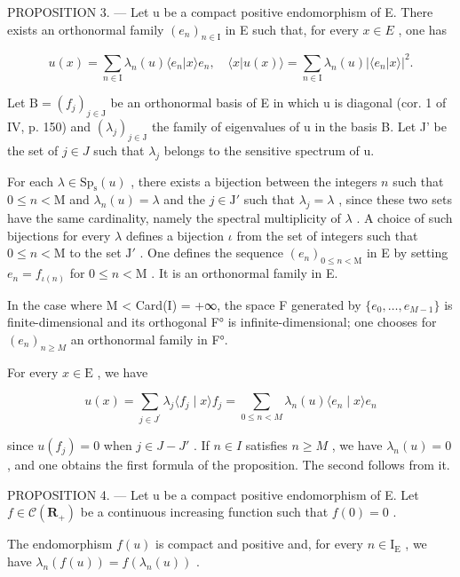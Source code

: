 PROPOSITION 3. --- Let u be a compact positive endomorphism of E. There exists an orthonormal family \((e_{n})_{n\in\mathrm{I}}\) in E such that, for every \(x\in E\) , one has

\[
u (x) = \sum_ {n \in \mathrm{I}} \lambda_ {n} (u) \langle e _ {n} | x \rangle e _ {n}, \quad \langle x | u (x) \rangle = \sum_ {n \in \mathrm{I}} \lambda_ {n} (u) | \langle e _ {n} | x \rangle | ^ {2}.
\]

Let \(\mathrm{B} = (f_{j})_{j \in \mathrm{J}}\) be an orthonormal basis of E in which u is diagonal (cor. 1 of IV, p. 150) and \((\lambda_{j})_{j \in \mathrm{J}}\) the family of eigenvalues of u in the basis B. Let J' be the set of \(j \in J\) such that \(\lambda_{j}\) belongs to the sensitive spectrum of u.

For each \(\lambda \in \mathrm{Sp}_{\mathrm{s}}(u)\) , there exists a bijection between the integers \(n\) such that \(0 \leqslant n < \mathrm{M}\) and \(\lambda_{n}(u) = \lambda\) and the \(j \in \mathrm{J}'\) such that \(\lambda_{j} = \lambda\) , since these two sets have the same cardinality, namely the spectral multiplicity of \(\lambda\) . A choice of such bijections for every \(\lambda\) defines a bijection \(\iota\) from the set of integers such that \(0 \leqslant n < \mathrm{M}\) to the set \(\mathrm{J}'\) . One defines the sequence \((e_n)_{0 \leqslant n < \mathrm{M}}\) in E by setting \(e_n = f_{\iota(n)}\) for \(0 \leqslant n < \mathrm{M}\) . It is an orthonormal family in E.

In the case where M \textless{} Card(I) = +∞, the space F generated by \(\{e_{0},\ldots,e_{M-1}\}\) is finite-dimensional and its orthogonal F° is infinite-dimensional; one chooses for \((e_{n})_{n\geqslant M}\) an orthonormal family in F°.

For every \(x \in \mathrm{E}\) , we have

\[
u (x) = \sum_ {j \in J ^ {\prime}} \lambda_ {j} \langle f _ {j} \mid x \rangle f _ {j} = \sum_ {0 \leqslant n <   M} \lambda_ {n} (u) \langle e _ {n} \mid x \rangle e _ {n}
\]

since \(u(f_{j}) = 0\) when \(j \in J - J'\) . If \(n \in I\) satisfies \(n \geqslant M\) , we have \(\lambda_{n}(u) = 0\) , and one obtains the first formula of the proposition. The second follows from it.

PROPOSITION 4. --- Let u be a compact positive endomorphism of E. Let \(f \in \mathcal{C}(\mathbf{R}_{+})\) be a continuous increasing function such that \(f(0) = 0\) .

The endomorphism \(f(u)\) is compact and positive and, for every \(n \in \mathrm{I}_{\mathrm{E}}\) , we have \(\lambda_n(f(u)) = f(\lambda_n(u))\) .

